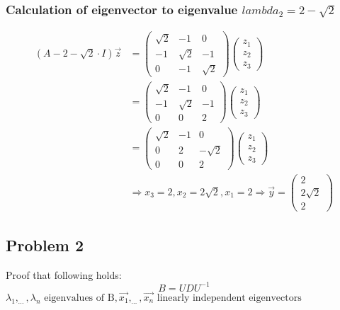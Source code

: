 \subsubsection*{Calculation of eigenvector to eigenvalue $lambda_{2}=2-\sqrt{2}$}
\begin{align*}
(A-2-\sqrt{2}\cdot I)\overrightarrow{z}	&=\begin{pmatrix}
									\sqrt{2}	&	-1	&	0\\
									-1	&	\sqrt{2}	&	-1\\
									0	&	-1	&	\sqrt{2}
								  \end{pmatrix} \begin{pmatrix}
									z_{1}\\
									z_{2}\\
									z_{3}
							 	  \end{pmatrix}\\
								&=\begin{pmatrix}
								  \sqrt{2}	&	-1	&	0\\
									-1	&	\sqrt{2}	&	-1\\
									0	&	0	&	2
								  \end{pmatrix} \begin{pmatrix}
									z_{1}\\
									z_{2}\\
									z_{3}
								  \end{pmatrix}\\
								&=\begin{pmatrix}
								  \sqrt{2}	&	-1	&	0\\
									0	&	2	&	-\sqrt{2}\\
									0	&	0	&	2
								  \end{pmatrix} \begin{pmatrix}
									z_{1}\\
									z_{2}\\
									z_{3}
								  \end{pmatrix}\\
								&\Rightarrow x_{3}=2,x_{2}=2\sqrt{2},x_{1}=2\Rightarrow\overrightarrow{y}=\begin{pmatrix}
								  2\\2\sqrt{2}\\2
								  \end{pmatrix}
\end{align*}

\subsection*{Problem 2}
Proof that following holds:
\begin{equation*}
B=UDU^{-1}
\end{equation*}
$\lambda_{1},_{\cdots},\lambda_{n}\text{ eigenvalues of B},\overrightarrow{x_{1}},_{\cdots},\overrightarrow{x_{n}}\text{ linearly independent eigenvectors}$

